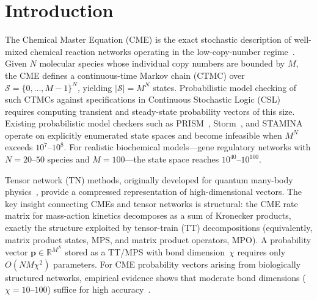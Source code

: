 \documentclass[11pt]{article}
\newcommand{\R}{\mathbb{R}}
\newcommand{\calS}{\mathcal{S}}
\begin{document}
\begin{abstract}
We validate on 51~biological models covering metabolic networks,
gene regulation, signaling pathways, cell cycle, population dynamics,
and stochastic phenomena.
Cross-validation against dense reference solutions on 30 CSL properties
across 10~models achieves 100\% verdict agreement (including
conservative INDETERMINATE verdicts).
Deficiency analysis identifies 15+ networks with deficiency zero,
confirming product-form steady states.
Entanglement entropy analysis confirms area-law scaling
($S_{\max} < 3.0$) across all tested biological networks,
justifying the TT approach.
MPO compression ratios reach $7.8\times 10^{13}$ at $N=10$ species;
bond dimension $\chi=10$ yields L1 error $1.62\times 10^{-12}$;
and the 11-check certificate pipeline produces SOUND verdicts
with total errors $\leq 2.38\times 10^{-2}$.
\end{abstract}

\section{Introduction}\label{sec:intro}

The Chemical Master Equation (CME) is the exact stochastic description of
well-mixed chemical reaction networks operating in the low-copy-number
regime~\cite{gillespie1992,vanKampen2007}.
Given $N$ molecular species whose individual copy numbers are bounded by $M$,
the CME defines a continuous-time Markov chain (CTMC) over
$\calS = \{0,\ldots,M-1\}^N$, yielding $|\calS| = M^N$ states.
Probabilistic model checking of such CTMCs against specifications in
Continuous Stochastic Logic (CSL)~\cite{aziz2000} requires computing
transient and steady-state probability vectors of this size.
Existing probabilistic model checkers such as
PRISM~\cite{kwiatkowska2011}, Storm~\cite{hensel2022}, and
STAMINA~\cite{neupane2019} operate on explicitly enumerated state spaces
and become infeasible when $M^N$ exceeds $10^7$--$10^8$.
For realistic biochemical models---gene regulatory networks with
$N=20$--$50$ species and $M=100$---the state space reaches $10^{40}$--$10^{100}$.

Tensor network (TN) methods, originally developed for quantum many-body
physics~\cite{white1992,schollwoeck2011}, provide a compressed representation
of high-dimensional vectors.
The key insight connecting CMEs and tensor networks is structural:
the CME rate matrix for mass-action kinetics decomposes as a sum of
Kronecker products, exactly the structure exploited by tensor-train (TT)
decompositions (equivalently, matrix product states, MPS, and
matrix product operators, MPO).
A probability vector $\mathbf{p} \in \R^{M^N}$ stored as a TT/MPS with
bond dimension~$\chi$ requires only $O(NM\chi^2)$ parameters.
For CME probability vectors arising from biologically structured networks,
empirical evidence shows that moderate bond dimensions ($\chi = 10$--$100$)
suffice for high accuracy~\cite{kazeev2014,ion2021}.
\end{document}
